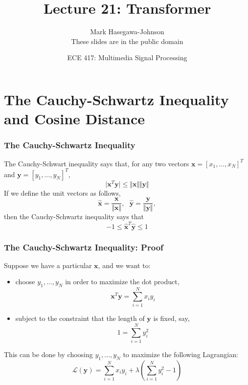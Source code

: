 \documentclass{beamer}
\title{Lecture 21: Transformer}
\author{Mark Hasegawa-Johnson\\These slides are in the public domain}
\date{ECE 417: Multimedia Signal Processing}
\institute{University of Illinois}
\begin{document}
\begin{frame}
  \maketitle
\end{frame}

\begin{frame}
  \tableofcontents
\end{frame}

\section[Cauchy-Schwartz]{The Cauchy-Schwartz Inequality and Cosine Distance}
\setcounter{subsection}{1}

\begin{frame}
  \frametitle{The Cauchy-Schwartz Inequality}

  The Cauchy-Schwart inequality says that, for any two vectors
  $\bm{x}=[x_1,\ldots,x_N]^T$ and $\bm{y}=[y_1,\ldots,y_N]^T$,
  \begin{displaymath}
    \vert\bm{x}^T\bm{y}\vert \le \Vert\bm{x}\Vert \Vert\bm{y}\Vert
  \end{displaymath}
  If we define the unit vectors as follows,
  \begin{displaymath}
    \hat{\bm{x}}=\frac{\bm{x}}{\Vert\bm{x}\Vert},~~~
    \hat{\bm{y}}=\frac{\bm{y}}{\Vert\bm{y}\Vert},
  \end{displaymath}
  then the Cauchy-Schwartz inequality says that
  \begin{displaymath}
    -1 \le \hat{\bm{x}}^T\hat{\bm{y}} \le 1
  \end{displaymath}
\end{frame}

\begin{frame}
  \frametitle{The Cauchy-Schwartz Inequality: Proof}

  Suppose we have a particular $\bm{x}$, and we want to:
  \begin{itemize}
  \item choose $y_1,\ldots,y_N$ in order to maximize
    the dot product,
    \begin{displaymath}
      \bm{x}^T\bm{y}=\sum_{i=1}^N x_iy_i
    \end{displaymath}
  \item subject to the constraint that the length of $\bm{y}$ is
    fixed, say,
    \begin{displaymath}
      1 = \sum_{i=1}^N y_i^2
    \end{displaymath}
  \end{itemize}
  This can be done by choosing $y_1,\ldots,y_N$ to maximize the
  following Lagrangian:
  \begin{displaymath}
    {\mathcal L}(\bm{y}) = \sum_{i=1}^N x_iy_i + \lambda\left(\sum_{i=1}^N y_i^2-1\right)
  \end{displaymath}
\end{frame}
\end{document}
